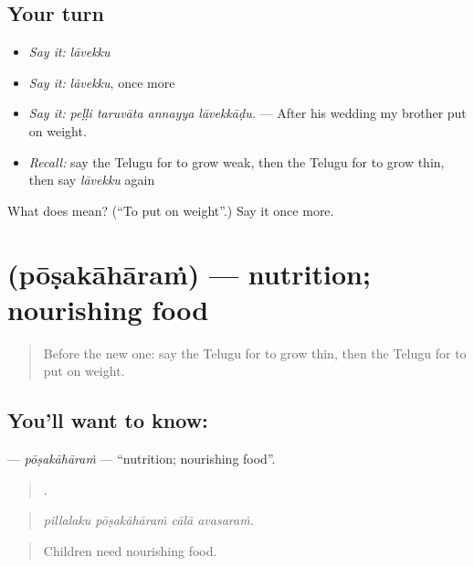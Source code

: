 \subsection*{Your turn}
\begin{itemize}
\raggedright
  \item \emph{Say it:} \emph{lāvekku}
  \item \emph{Say it:} \emph{lāvekku}, once more
  \item \emph{Say it:} \emph{peḷḷi taruvāta annayya lāvekkāḍu.} — After his wedding my brother put on weight.
  \item \emph{Recall:} say the Telugu for to grow weak, then the Telugu for to grow thin, then say \emph{lāvekku} again
\end{itemize}

\begin{tcolorbox}[breakable,colback=teal!4,colframe=teal!35!black,title={Before you move on}]
What does  mean? (\textquotedblleft{}To put on weight\textquotedblright{}.) Say it once more.
\end{tcolorbox}
\section[\texorpdfstring{\te{పోషకాహారం} (pōṣakāhāraṁ)}{పోషకాహారం (pōṣakāhāraṁ)}]{ (pōṣakāhāraṁ) — nutrition; nourishing food}

\label{lesson:TE-C521-posakaharam}



\begin{quote}
Before the new one: say the Telugu for to grow thin, then the Telugu for to put on weight.
\end{quote}

\subsection*{You'll want to know: }
\textbf{} — \emph{pōṣakāhāraṁ} — \textquotedblleft{}nutrition; nourishing food\textquotedblright{}.

\begin{quote}
   .
\end{quote}

\begin{quote}
\emph{pillalaku pōṣakāhāraṁ cālā avasaraṁ.}
\end{quote}

\begin{quote}
Children need nourishing food.
\end{quote}

